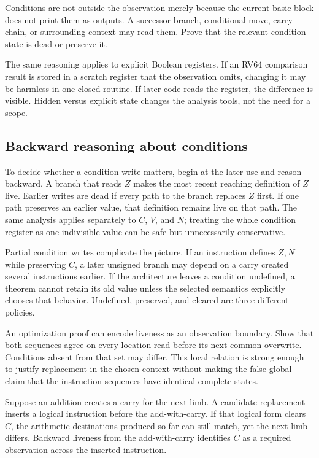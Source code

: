 \begin{warning}[title={Dead conditions require evidence}]
Conditions are not outside the observation merely because the current basic block does
not print them as outputs. A successor branch, conditional move, carry chain,
or surrounding context may read them. Prove that the relevant condition state
is dead or preserve it.
\end{warning}

The same reasoning applies to explicit Boolean registers. If an RV64 comparison
result is stored in a scratch register that the observation omits, changing it
may be harmless in one closed routine. If later code reads the register, the
difference is visible. Hidden versus explicit state changes the analysis tools,
not the need for a scope.

\subsection{Backward reasoning about conditions}

To decide whether a condition write matters, begin at the later use and reason
backward. A branch that reads \(Z\) makes the most recent reaching definition
of \(Z\) live. Earlier writes are dead if every path to the branch replaces
\(Z\) first. If one path preserves an earlier value, that definition remains
live on that path. The same analysis applies separately to \(C\), \(V\), and
\(N\); treating the whole condition register as one indivisible value can be
safe but unnecessarily conservative.

Partial condition writes complicate the picture. If an instruction defines
\(Z,N\) while preserving \(C\), a later unsigned branch may depend on a carry
created several instructions earlier. If the architecture leaves a condition
undefined, a theorem cannot retain its old value unless the selected semantics
explicitly chooses that behavior. Undefined, preserved, and cleared are three
different policies.

An optimization proof can encode liveness as an observation boundary. Show
that both sequences agree on every location read before its next common
overwrite. Conditions absent from that set may differ. This local relation is
strong enough to justify replacement in the chosen context without making the
false global claim that the instruction sequences have identical complete
states.

\begin{example}[title={A carry survives an unrelated-looking operation}]
Suppose an addition creates a carry for the next limb. A candidate replacement
inserts a logical instruction before the add-with-carry. If that logical form
clears \(C\), the arithmetic destinations produced so far can still match,
yet the next limb differs. Backward liveness from the add-with-carry identifies
\(C\) as a required observation across the inserted instruction.
\end{example}

